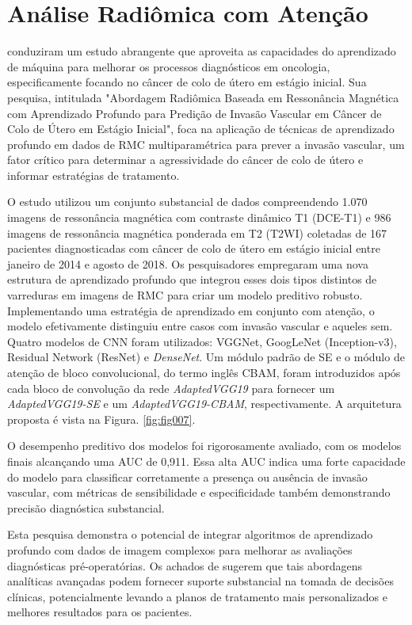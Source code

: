 \section{Análise Radiômica com Atenção}
\label{sec:analise_radiomica}

 conduziram um estudo abrangente que aproveita as capacidades do aprendizado de máquina para melhorar os processos diagnósticos em oncologia, especificamente focando no câncer de colo de útero em estágio inicial. Sua pesquisa, intitulada "Abordagem Radiômica Baseada em Ressonância Magnética com Aprendizado Profundo para Predição de Invasão Vascular em Câncer de Colo de Útero em Estágio Inicial", foca na aplicação de técnicas de aprendizado profundo em dados de \gls{RMC} multiparamétrica para prever a invasão vascular, um fator crítico para determinar a agressividade do câncer de colo de útero e informar estratégias de tratamento.

O estudo utilizou um conjunto substancial de dados compreendendo 1.070 imagens de ressonância magnética com contraste dinâmico T1 (DCE-T1) e 986 imagens de ressonância magnética ponderada em T2 (T2WI) coletadas de 167 pacientes diagnosticadas com câncer de colo de útero em estágio inicial entre janeiro de 2014 e agosto de 2018. Os pesquisadores empregaram uma nova estrutura de aprendizado profundo que integrou esses dois tipos distintos de varreduras em imagens de \gls{RMC} para criar um modelo preditivo robusto. Implementando uma estratégia de aprendizado em conjunto com atenção, o modelo efetivamente distinguiu entre casos com invasão vascular e aqueles sem. Quatro modelos de CNN foram utilizados: VGGNet, GoogLeNet (Inception-v3), Residual Network (ResNet) e \textit{DenseNet}. Um módulo padrão de \gls{SE}  e o módulo de atenção de bloco convolucional, do termo inglês \gls{CBAM},  foram introduzidos após cada bloco de convolução da rede \textit{AdaptedVGG19} para fornecer um \textit{AdaptedVGG19-SE} e um \textit{AdaptedVGG19-CBAM}, respectivamente. A arquitetura proposta é vista na Figura. \ref{fig:fig007}.

O desempenho preditivo dos modelos foi rigorosamente avaliado, com os modelos finais alcançando uma \gls{AUC} de 0,911. Essa alta \gls{AUC} indica uma forte capacidade do modelo para classificar corretamente a presença ou ausência de invasão vascular, com métricas de sensibilidade e especificidade também demonstrando precisão diagnóstica substancial.

Esta pesquisa demonstra o potencial de integrar algoritmos de aprendizado profundo com dados de imagem complexos para melhorar as avaliações diagnósticas pré-operatórias. Os achados de  sugerem que tais abordagens analíticas avançadas podem fornecer suporte substancial na tomada de decisões clínicas, potencialmente levando a planos de tratamento mais personalizados e melhores resultados para os pacientes.

